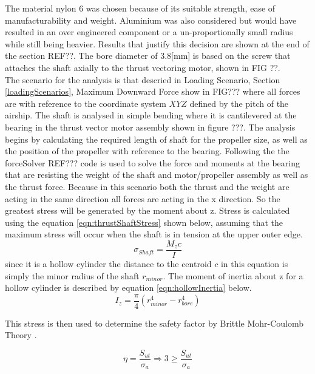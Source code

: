 \documentclass[../main.tex]{subfiles}
\begin{document}
The material nylon 6 was chosen because of its suitable strength, ease of manufacturability and weight. Aluminium was also considered but would have resulted in an over engineered component or a un-proportionally small radius while still being heavier. Results that justify this decision are shown at the end of the section REF??. The bore diameter of 3.8[mm] is based on the screw that attaches the shaft axially to the thrust vectoring motor, shown in FIG ??.\\

The scenario for the analysis is that descried in Loading Scenario, Section \ref{loadingScenarios}, Maximum Downward Force show in FIG??? where all forces are with reference to the coordinate system $XYZ$ defined by the pitch of the airship. The shaft is analysed in simple bending where it is cantilevered at the bearing in the thrust vector motor assembly shown in figure ???. The analysis begins by calculating the required length of shaft for the propeller size, as well as the position of the propeller with reference to the bearing. Following the the forceSolver REF??? code is used to solve the force and moments at the bearing that are resisting the weight of the shaft and motor/propeller assembly as well as the thrust force. Because in this scenario both the thrust and the weight are acting in the same direction all forces are acting in the x direction. So the greatest stress will be generated by the moment about z. Stress is calculated using the equation \ref{eqn:thrustShaftStress} shown below, assuming that the maximum stress will occur when the shaft is in tension at the upper outer edge. 
\begin{equation}
\label{eqn:thrustShaftStress} 
\sigma _{Shaft}  = \dfrac{M_{z}c}{I} 
\end{equation}
since it is a hollow cylinder the distance to the centroid $c$ in this equation is simply the minor radius of the shaft $r_{minor}$. The moment of inertia about z for a hollow cylinder is described by equation \ref{eqn:hollowInertia} below.
\begin{equation}
\label{eqn:hollowInertia} 
I _{z}  = \dfrac{\pi}{4} (r_{minor}^4 - r_{bore}^4)
\end{equation}

This stress is then used to determine the safety factor by Brittle Mohr-Coulomb Theory \cite[227]{shigley}.

\begin{equation}
\eta = \dfrac{S_{ut}}{\sigma _a} \Rightarrow 3 \geq \dfrac{S_{ut}}{\sigma _a}
\end{equation}
\end{document}
